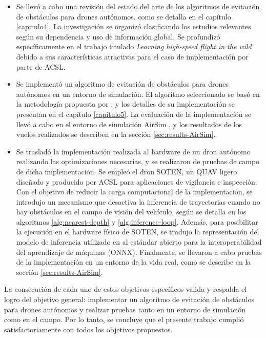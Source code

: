 \begin{itemize}
\item{
    Se llevó a cabo una revisión del estado del arte de los algoritmos de evitación de obstáculos para drones autónomos, como se detalla en el capítulo \ref{capitulo4}. La investigación se organizó clasificando los estudios relevantes según su dependencia y uso de información global. Se profundizó específicamente en el trabajo titulado \textit{Learning high-speed flight in the wild} \cite{Loquercio2021} debido a sus características atractivas para el caso de implementación por parte de ACSL.
}

\item{
    Se implementó un algoritmo de evitación de obstáculos para drones autónomos en un entorno de simulación. El algoritmo seleccionado se basó en la metodología propuesta por \cite{Loquercio2021}, y los detalles de su implementación se presentan en el capítulo \ref{capitulo5}. La evaluación de la implementación se llevó a cabo en el entorno de simulación AirSim \cite{shah2018airsim}, y los resultados de los vuelos realizados se describen en la sección \ref{sec:results-AirSim}.
}

\item{
    Se trasladó la implementación realizada al hardware de un dron autónomo realizando las optimizaciones necesarias, y se realizaron de pruebas de campo de dicha implementación. Se empleó el dron SOTEN, un QUAV ligero diseñado y producido por ACSL para aplicaciones de vigilancia e inspección. Con el objetivo de reducir la carga computacional de la implementación, se introdujo un mecanismo que desactiva la inferencia de trayectorias cuando no hay obstáculos en el campo de visión del vehículo, según se detalla en los algoritmos \ref{alg:nearest-depth} y \ref{alg:inference-loop}. Además, para posibilitar la ejecución en el hardware físico de SOTEN, se tradujo la representación del modelo de inferencia utilizado en \cite{Loquercio2021} al estándar abierto para la interoperabilidad del aprendizaje de máquinas (ONNX). Finalmente, se llevaron a cabo pruebas de la implementación en un entorno de la vida real, como se describe en la sección \ref{sec:results-AirSim}.
}
\end{itemize}

La consecución de cada uno de estos objetivos específicos valida y respalda el logro del objetivo general: implementar un algoritmo de evitación de obstáculos para drones autónomos y realizar pruebas tanto en un entorno de simulación como en el campo. Por lo tanto, se concluye que el presente trabajo cumplió satisfactoriamente con todos los objetivos propuestos.


